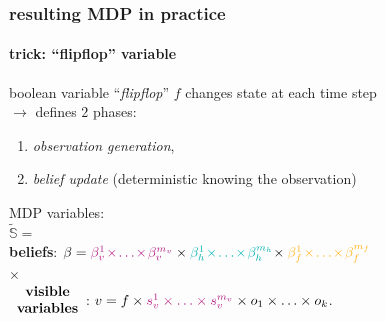 \documentclass[12pt,svgnames,table]{beamer}
\begin{document}
{\begin{frame}
\frametitle{resulting MDP in practice}
\framesubtitle{\footnotesize trick: ``flipflop'' variable}

\begin{block}{}
boolean variable ``\textit{flipflop}'' $f$ 
changes state at each time step\\ 
$\rightarrow$ defines $2$ phases:
\begin{enumerate}
\item \textit{observation generation}, 
\item \textit{belief update} (deterministic knowing the observation) 
\end{enumerate}
\end{block}
MDP variables:\\ 
\vspace{0.3cm}
$\tilde{\mathbb{S}} =$ \\
 \textbf{beliefs}: \hspace{-0.2cm} $\beta = { \color{violet} \beta^1_v \hspace{-0.05cm} \times \hspace{-0.05cm} \ldots \hspace{-0.05cm} \times \hspace{-0.05cm} \beta^{m_v}_v } \times  { \color{gggreen} \beta^1_h \hspace{-0.05cm} \times \hspace{-0.05cm} \ldots \hspace{-0.05cm} \times \hspace{-0.05cm} \beta^{m_h}_h } \hspace{-0.07cm} \times { \color{orangee} \beta^1_f \hspace{-0.05cm} \times \hspace{-0.05cm} \ldots \hspace{-0.05cm} \times \hspace{-0.05cm} \beta^{m_f}_f } $ \\
\vspace{0.15cm}
\hspace{2cm} $\times$ \\
$ \begin{array}{c} \mbox{\textbf{visible}} \\ \mbox{\textbf{variables}} \end{array} $: $v = f \times { \color{violet} s^1_v \times \ldots \times s^{m_v}_v } \times o_1 \times \ldots \times o_{k} $.
\end{frame}

}
\end{document}
